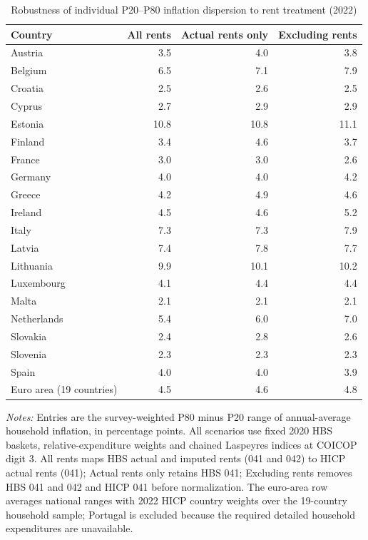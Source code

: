 \begin{table}[!htbp]
\small
\setlength{\tabcolsep}{4pt}

\caption{\label{tab:rent-mapping-robustness}Robustness of individual P20--P80 inflation dispersion to rent treatment (2022)}
\centering
\begin{tabular}[t]{lrrr}
\toprule
Country & All rents & Actual rents only & Excluding rents\\
\midrule
Austria & 3.5 & 4.0 & 3.8\\
Belgium & 6.5 & 7.1 & 7.9\\
Croatia & 2.5 & 2.6 & 2.5\\
Cyprus & 2.7 & 2.9 & 2.9\\
Estonia & 10.8 & 10.8 & 11.1\\
\addlinespace
Finland & 3.4 & 4.6 & 3.7\\
France & 3.0 & 3.0 & 2.6\\
Germany & 4.0 & 4.0 & 4.2\\
Greece & 4.2 & 4.9 & 4.6\\
Ireland & 4.5 & 4.6 & 5.2\\
\addlinespace
Italy & 7.3 & 7.3 & 7.9\\
Latvia & 7.4 & 7.8 & 7.7\\
Lithuania & 9.9 & 10.1 & 10.2\\
Luxembourg & 4.1 & 4.4 & 4.4\\
Malta & 2.1 & 2.1 & 2.1\\
\addlinespace
Netherlands & 5.4 & 6.0 & 7.0\\
Slovakia & 2.4 & 2.8 & 2.6\\
Slovenia & 2.3 & 2.3 & 2.3\\
Spain & 4.0 & 4.0 & 3.9\\
Euro area (19 countries) & 4.5 & 4.6 & 4.8\\
\bottomrule
\end{tabular}

\begin{flushleft}
\footnotesize{\emph{Notes:} Entries are the survey-weighted P80 minus P20 range of annual-average household inflation, in percentage points. All scenarios use fixed 2020 HBS baskets, relative-expenditure weights and chained Laspeyres indices at COICOP digit 3. All rents maps HBS actual and imputed rents (041 and 042) to HICP actual rents (041); Actual rents only retains HBS 041; Excluding rents removes HBS 041 and 042 and HICP 041 before normalization. The euro-area row averages national ranges with 2022 HICP country weights over the 19-country household sample; Portugal is excluded because the required detailed household expenditures are unavailable.}
\end{flushleft}
\end{table}
